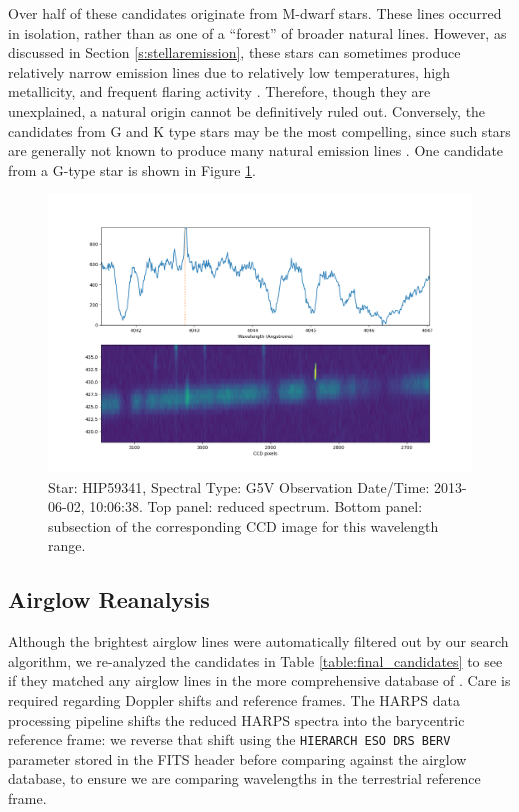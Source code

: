 \documentclass[linenumbers]{aastex631}
\begin{document}
Over half of these candidates originate from M-dwarf stars. These lines occurred in isolation, rather than as one of a ``forest'' of broader natural lines. However, as discussed in Section \ref{s:stellaremission}, these stars can sometimes produce relatively narrow emission lines due to relatively low temperatures, high metallicity, and frequent flaring activity \citep{Marcy_2021}. Therefore, though they are unexplained, a natural origin cannot be definitively ruled out. Conversely, the candidates from G and K type stars may be the most compelling, since such stars are generally not known to produce many natural emission lines \citep{stellar_emission_linesJ}. One candidate from a G-type star is shown in Figure \ref{fig:seti_candidate_HIP59341}.

\begin{figure}
    \centering  \includegraphics[width=\textwidth]{G5Vtype.png}
    \caption{Star: HIP59341, Spectral Type: G5V Observation Date/Time: 2013-06-02, 10:06:38.  Top panel: reduced spectrum.  Bottom panel: subsection of the corresponding CCD image for this wavelength range.}
    \label{fig:seti_candidate_HIP59341}
\end{figure}

\subsection{Airglow Reanalysis}
\label{s:airglow_reanalysis}

Although the brightest airglow lines were automatically filtered out by our search algorithm, we re-analyzed the candidates in Table \ref{table:final_candidates} to see if they matched any airglow lines in the more comprehensive database of \cite{faint_airglow_database}.  Care is required regarding Doppler shifts and reference frames. The HARPS data processing pipeline shifts the reduced HARPS spectra into the barycentric reference frame: we reverse that shift using the \texttt{HIERARCH ESO DRS BERV} parameter stored in the FITS header before comparing against the airglow database, to ensure we are comparing wavelengths in the terrestrial reference frame.
\end{document}
